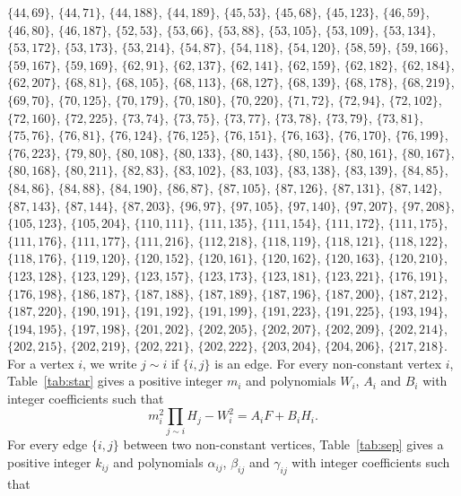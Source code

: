 \documentclass[11pt]{article}
\begin{document}
$\{44,69\}$, $\{44,71\}$, $\{44,188\}$, $\{44,189\}$, $\{45,53\}$, $\{45,68\}$, $\{45,123\}$, $\{46,59\}$, $\{46,80\}$, $\{46,187\}$, $\{52,53\}$, $\{53,66\}$, $\{53,88\}$, $\{53,105\}$, $\{53,109\}$, $\{53,134\}$, $\{53,172\}$, $\{53,173\}$, $\{53,214\}$, $\{54,87\}$, $\{54,118\}$, $\{54,120\}$, $\{58,59\}$, $\{59,166\}$, $\{59,167\}$, $\{59,169\}$, $\{62,91\}$, $\{62,137\}$, $\{62,141\}$, $\{62,159\}$, $\{62,182\}$, $\{62,184\}$, $\{62,207\}$, $\{68,81\}$, $\{68,105\}$, $\{68,113\}$, $\{68,127\}$, $\{68,139\}$, $\{68,178\}$, $\{68,219\}$, $\{69,70\}$, $\{70,125\}$, $\{70,179\}$, $\{70,180\}$, $\{70,220\}$, $\{71,72\}$, $\{72,94\}$, $\{72,102\}$, $\{72,160\}$, $\{72,225\}$, $\{73,74\}$, $\{73,75\}$, $\{73,77\}$, $\{73,78\}$, $\{73,79\}$, $\{73,81\}$, $\{75,76\}$, $\{76,81\}$, $\{76,124\}$, $\{76,125\}$, $\{76,151\}$, $\{76,163\}$, $\{76,170\}$, $\{76,199\}$, $\{76,223\}$, $\{79,80\}$, $\{80,108\}$, $\{80,133\}$, $\{80,143\}$, $\{80,156\}$, $\{80,161\}$, $\{80,167\}$, $\{80,168\}$, $\{80,211\}$, $\{82,83\}$, $\{83,102\}$, $\{83,103\}$, $\{83,138\}$, $\{83,139\}$, $\{84,85\}$, $\{84,86\}$, $\{84,88\}$, $\{84,190\}$, $\{86,87\}$, $\{87,105\}$, $\{87,126\}$, $\{87,131\}$, $\{87,142\}$, $\{87,143\}$, $\{87,144\}$, $\{87,203\}$, $\{96,97\}$, $\{97,105\}$, $\{97,140\}$, $\{97,207\}$, $\{97,208\}$, $\{105,123\}$, $\{105,204\}$, $\{110,111\}$, $\{111,135\}$, $\{111,154\}$, $\{111,172\}$, $\{111,175\}$, $\{111,176\}$, $\{111,177\}$, $\{111,216\}$, $\{112,218\}$, $\{118,119\}$, $\{118,121\}$, $\{118,122\}$, $\{118,176\}$, $\{119,120\}$, $\{120,152\}$, $\{120,161\}$, $\{120,162\}$, $\{120,163\}$, $\{120,210\}$, $\{123,128\}$, $\{123,129\}$, $\{123,157\}$, $\{123,173\}$, $\{123,181\}$, $\{123,221\}$, $\{176,191\}$, $\{176,198\}$, $\{186,187\}$, $\{187,188\}$, $\{187,189\}$, $\{187,196\}$, $\{187,200\}$, $\{187,212\}$, $\{187,220\}$, $\{190,191\}$, $\{191,192\}$, $\{191,199\}$, $\{191,223\}$, $\{191,225\}$, $\{193,194\}$, $\{194,195\}$, $\{197,198\}$, $\{201,202\}$, $\{202,205\}$, $\{202,207\}$, $\{202,209\}$, $\{202,214\}$, $\{202,215\}$, $\{202,219\}$, $\{202,221\}$, $\{202,222\}$, $\{203,204\}$, $\{204,206\}$, $\{217,218\}$. For a vertex $i$, we write $j\sim i$ if $\{i,j\}$ is an edge.
For every non-constant vertex $i$, Table~\ref{tab:star} gives a positive integer $m_{i}$ and polynomials $W_{i}$, $A_{i}$ and $B_{i}$ with integer coefficients such that
\begin{equation}\label{eq:star}
m_i^2\prod_{j\sim i}H_j-W_i^2=A_iF+B_iH_i.
\end{equation}
For every edge $\{i,j\}$ between two non-constant vertices, Table~\ref{tab:sep} gives a positive integer $k_{ij}$ and polynomials $\alpha_{ij}$, $\beta_{ij}$ and $\gamma_{ij}$ with integer coefficients such that
\end{document}

